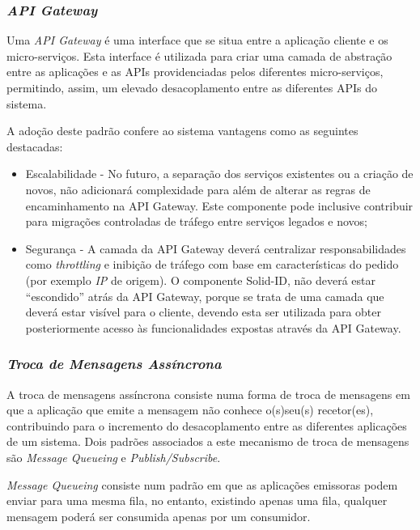 \subsubsection{\emph{API Gateway}} \label{api_gateway}
Uma \emph{API Gateway} é uma interface que se situa entre a aplicação cliente e os micro-serviços. Esta interface é utilizada para criar uma camada de abstração entre as aplicações e as APIs providenciadas pelos diferentes micro-serviços, permitindo, assim, um elevado desacoplamento entre as diferentes APIs do sistema.

A adoção deste padrão confere ao sistema vantagens como as seguintes destacadas:
\begin{itemize}
    \item Escalabilidade - No futuro, a separação dos serviços existentes ou a criação de novos, não adicionará complexidade para além de alterar as regras de encaminhamento na API Gateway. Este componente pode inclusive contribuir para migrações controladas de tráfego entre serviços legados e novos;
    
    \item Segurança - A camada da API Gateway deverá centralizar responsabilidades como \emph{throttling} e inibição de tráfego com base em características do pedido (por exemplo \emph{IP} de origem). O componente Solid-ID, não deverá estar “escondido” atrás da API Gateway, porque se trata de uma camada que deverá estar visível para o cliente, devendo esta ser utilizada para obter posteriormente acesso às funcionalidades expostas através da API Gateway.
\end{itemize}

\subsubsection{\emph{Troca de Mensagens Assíncrona}} \label{troca_mensagens_assincrona}
A troca de mensagens assíncrona consiste numa forma de troca de mensagens em que a aplicação que emite a mensagem não conhece o(s)seu(s) recetor(es), contribuindo para o incremento do desacoplamento entre as diferentes aplicações de um sistema.
Dois padrões associados a este mecanismo de troca de mensagens são \emph{Message Queueing} e \emph{Publish/Subscribe}.

\emph{Message Queueing} \label{message_queueing} consiste num padrão em que as aplicações emissoras podem enviar para uma mesma fila, no entanto, existindo  apenas uma fila, qualquer mensagem poderá ser consumida apenas por um consumidor.

